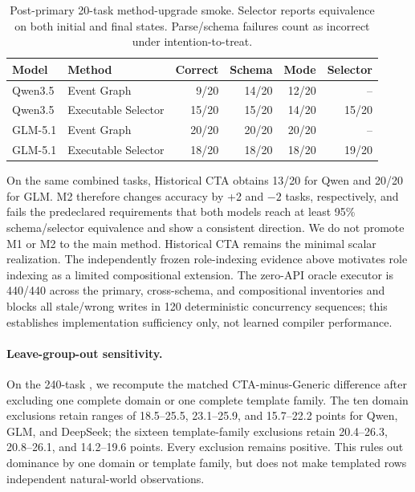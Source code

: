 \documentclass[10pt]{article}
\begin{document}
\begin{table}[h]
\centering
\small
\begin{tabular}{llrrrr}
\toprule
Model & Method & Correct & Schema & Mode & Selector \\
\midrule
Qwen3.5 & Event Graph & 9/20 & 14/20 & 12/20 & -- \\
Qwen3.5 & Executable Selector & 15/20 & 15/20 & 14/20 & 15/20 \\
GLM-5.1 & Event Graph & 20/20 & 20/20 & 20/20 & -- \\
GLM-5.1 & Executable Selector & 18/20 & 18/20 & 18/20 & 19/20 \\
\bottomrule
\end{tabular}
\caption{Post-primary 20-task method-upgrade smoke. Selector reports equivalence on both initial
and final states. Parse/schema failures count as incorrect under intention-to-treat.}
\end{table}

On the same combined tasks, Historical CTA obtains 13/20 for Qwen and 20/20 for GLM. M2 therefore
changes accuracy by +2 and $-2$ tasks, respectively, and fails the predeclared requirements that
both models reach at least 95\% schema/selector equivalence and show a consistent direction.
We do not promote M1 or M2 to the main method. Historical CTA remains the minimal scalar realization.
The independently frozen role-indexing evidence above motivates role indexing as a limited
compositional extension. The zero-API oracle executor is 440/440 across the primary, cross-schema,
and compositional inventories and blocks all stale/wrong writes in 120 deterministic concurrency
sequences; this establishes implementation sufficiency only,
not learned compiler performance.

\paragraph{Leave-group-out sensitivity.}
On the 240-task \NewSchemaReplication{}, we recompute the matched CTA-minus-Generic difference after
excluding one complete domain or one complete template family. The ten domain exclusions retain
ranges of 18.5--25.5, 23.1--25.9, and 15.7--22.2 points for Qwen, GLM, and DeepSeek; the sixteen
template-family exclusions retain 20.4--26.3, 20.8--26.1, and 14.2--19.6 points. Every exclusion
remains positive. This rules out dominance by one domain or template family, but does not make
templated rows independent natural-world observations.
\end{document}
